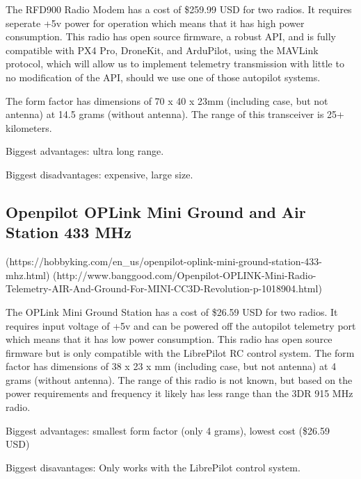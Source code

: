 \documentclass[compsoc,draftclsnofoot,onecolumn,10pt]{IEEEtran}
\begin{document}
The RFD900 Radio Modem has a cost of \$259.99 USD for two radios. It requires
seperate +5v power for operation which means that it has high power
consumption. This radio has open source firmware, a robust API, and is fully
compatible with PX4 Pro, DroneKit, and ArduPilot, using the MAVLink protocol,
which will allow us to implement telemetry transmission with little to no
modification of the API, should we use one of those autopilot systems.

The form factor has dimensions of 70 x 40 x 23mm (including case, but not
antenna) at 14.5 grams (without
antenna).
The range of this transceiver is 25+ kilometers.

Biggest advantages: ultra long range.

Biggest disadvantages: expensive, large size.

\subsection{Openpilot OPLink Mini Ground and Air Station 433 MHz}
(https://hobbyking.com/en\_us/openpilot-oplink-mini-ground-station-433-mhz.html)
(http://www.banggood.com/Openpilot-OPLINK-Mini-Radio-Telemetry-AIR-And-Ground-For-MINI-CC3D-Revolution-p-1018904.html)\par

The OPLink Mini Ground Station has a cost of \$26.59 USD for two radios. It
requires input voltage of +5v and can be powered off the autopilot telemetry
port which means that it has low power consumption. This radio has open source
firmware but is only compatible with the LibrePilot RC control system. 
The form factor has dimensions of 38 x 23 x mm (including case, but not
antenna) at 4 grams (without antenna).
The range of this radio is not known, but based on the power requirements and
frequency it likely has less range than the 3DR 915 MHz radio.

Biggest advantages: smallest form factor (only 4 grams), lowest cost (\$26.59
USD)

Biggest disavantages: Only works with the LibrePilot control system.
\end{document}
